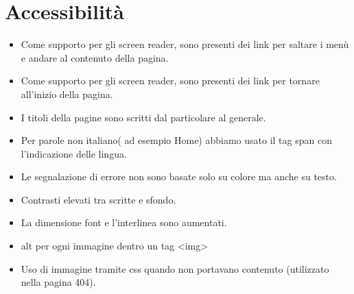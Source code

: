 \documentclass[1_relazione.tex]{subfiles}
\begin{document}
\section{Accessibilit\`{a}}
\begin{itemize}
\item Come supporto per gli screen reader, sono presenti dei link per saltare i men\`{u} e andare al contenuto della pagina.

\item Come supporto per gli screen reader, sono presenti dei link per tornare all'inizio della pagina.

\item I titoli della pagine sono scritti dal particolare al generale.

\item Per parole non italiano( ad esempio Home) abbiamo usato il tag span con l'indicazione delle lingua.

\item Le segnalazione di errore non sono basate solo su colore ma anche su testo. 

\item Contrasti elevati tra scritte e sfondo. 

\item La dimensione font e l'interlinea sono aumentati.

\item alt per ogni immagine dentro un tag <img>

\item Uso di immagine tramite css quando non portavano contenuto (utilizzato nella pagina 404).

\end{itemize}
\end{document}
